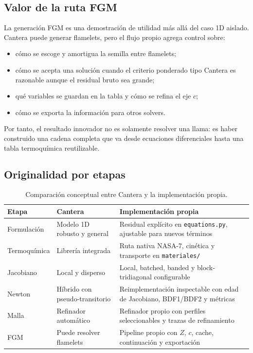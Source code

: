 \documentclass[12pt,a4paper]{article}
\begin{document}
\subsection{Valor de la ruta FGM}

La generación FGM es una demostración de utilidad más allá del caso 1D aislado. Cantera puede generar flamelets, pero el flujo propio agrega control sobre:

\begin{itemize}
  \item cómo se escoge y amortigua la semilla entre flamelets;
  \item cómo se acepta una solución cuando el criterio ponderado tipo Cantera es razonable aunque el residual bruto sea grande;
  \item qué variables se guardan en la tabla y cómo se refina el eje $c$;
  \item cómo se exporta la información para otros solvers.
\end{itemize}

Por tanto, el resultado innovador no es solamente resolver una llama: es haber construido una cadena completa que va desde ecuaciones diferenciales hasta una tabla termoquímica reutilizable.

\subsection{Originalidad por etapas}

\begin{table}[H]
  \centering
  \caption{Comparación conceptual entre Cantera y la implementación propia.}
  \label{tab:originalidad}
  \small
  \begin{tabular}{L{0.25\textwidth}L{0.31\textwidth}L{0.35\textwidth}}
    \toprule
    Etapa & Cantera & Implementación propia\\
    \midrule
    Formulación & Modelo 1D robusto y general & Residual explícito en \texttt{equations.py}, ajustable para nuevos términos\\
    Termoquímica & Librería integrada & Ruta nativa NASA-7, cinética y transporte en \texttt{materiales/}\\
    Jacobiano & Local y disperso & Local, batched, banded y block-tridiagonal configurable\\
    Newton & Híbrido con pseudo-transitorio & Reimplementación inspectable con edad de Jacobiano, BDF1/BDF2 y métricas\\
    Malla & Refinador automático & Refinador propio con perfiles seleccionables y trazas de refinamiento\\
    FGM & Puede resolver flamelets & Pipeline propio con $Z$, $c$, cache, continuación y exportación\\
    \bottomrule
  \end{tabular}
\end{table}
\end{document}
